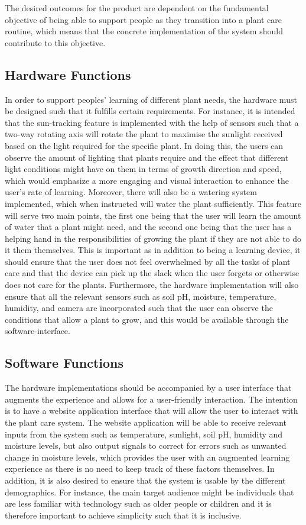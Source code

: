 \documentclass{article}
\begin{document}
The desired outcomes for the product are dependent on the fundamental objective of being able to support people as they transition into a plant care routine, which means that the concrete implementation of the system should contribute to this objective.

\subsection{Hardware Functions}
In order to support peoples' learning of different plant needs, the hardware must be designed such that it fulfills certain requirements. For instance, it is intended that the sun-tracking feature is implemented with the help of sensors such that a two-way rotating axis will rotate the plant to maximise the sunlight received based on the light required for the specific plant. In doing this, the users can observe the amount of lighting that plants require and the effect that different light conditions might have on them in terms of growth direction and speed, which would emphasize a more engaging and visual interaction to enhance the user’s rate of learning. Moreover, there will also be a watering system implemented, which when instructed will water the plant sufficiently. This feature will serve two main points, the first one being that the user will learn the amount of water that a plant might need, and the second one being that the user has a helping hand in the responsibilities of growing the plant if they are not able to do it them themselves. This is important as in addition to being a learning device, it should ensure that the user does not feel overwhelmed by all the tasks of plant care and that the device can pick up the slack when the user forgets or otherwise does not care for the plants. Furthermore, the hardware implementation will also ensure that all the relevant sensors such as soil pH, moisture, temperature, humidity, and camera are incorporated such that the user can observe the conditions that allow a plant to grow, and this would be available through the software-interface.

\subsection{Software Functions}
The hardware implementations should be accompanied by a user interface that augments the experience and allows for a user-friendly interaction. The intention is to have a website application interface that will allow the user to interact with the plant care system. The website application will be able to receive relevant inputs from the system such as temperature, sunlight, soil pH, humidity and moisture levels, but also output signals to correct for errors such as unwanted change in moisture levels, which provides the user with an augmented learning experience as there is no need to keep track of these factors themselves. In addition, it is also desired to ensure that the system is usable by the different demographics. For instance, the main target audience might be individuals that are less familiar with technology such as older people or children and it is therefore important to achieve simplicity such that it is inclusive.
\end{document}
